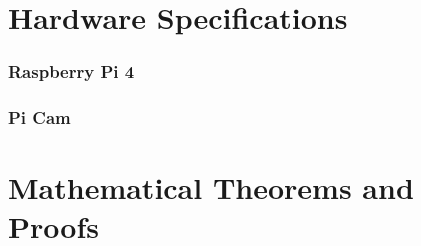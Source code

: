 \begin{appendices}

    \chapter{Hardware Specifications}

        \subsection{Raspberry Pi 4}


        \subsection{Pi Cam}

    \chapter{Mathematical Theorems and Proofs}

\end{appendices}